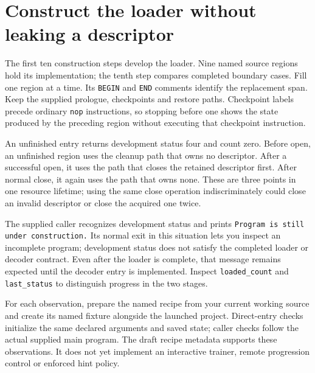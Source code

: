 \section{Construct the loader without leaking a descriptor}
The first ten construction steps develop the loader. Nine named source regions hold
its implementation; the tenth step compares completed boundary cases. Fill one region
at a time. Its \texttt{BEGIN} and \texttt{END} comments identify the replacement span.
Keep the supplied prologue, checkpoints and restore paths. Checkpoint labels precede
ordinary \texttt{nop} instructions, so stopping before one shows the state produced
by the preceding region without executing that checkpoint instruction.

An unfinished entry returns development status four and count zero. Before open, an
unfinished region uses the cleanup path that owns no descriptor. After a successful
open, it uses the path that closes the retained descriptor first. After normal close,
it again uses the path that owns none. These are three points in one resource lifetime;
using the same close operation indiscriminately could close an invalid descriptor or
close the acquired one twice.

The supplied caller recognizes development status and prints
\texttt{Program is still under construction.} Its normal exit in this situation lets
you inspect an incomplete program; development status does not satisfy the completed
loader or decoder contract. Even after the loader is complete, that message remains
expected until the decoder entry is implemented. Inspect \texttt{loaded\_count} and
\texttt{last\_status} to distinguish progress in the two stages.

For each observation, prepare the named recipe from your current working source and
create its named fixture alongside the launched project. Direct-entry checks initialize
the same declared arguments and saved state; caller checks follow the actual supplied
main program. The draft recipe metadata supports these observations. It does not yet
implement an interactive trainer, remote progression control or enforced hint policy.
